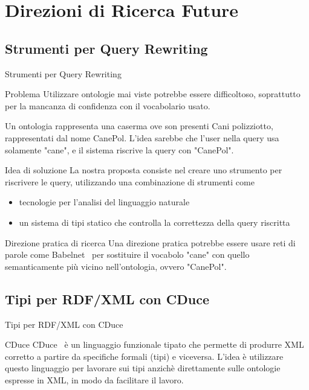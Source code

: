 \section{Direzioni di Ricerca Future}

\subsection{Strumenti per Query Rewriting}
\begin{frame}{Strumenti per Query Rewriting}
    \begin{block}{Problema}
        Utilizzare ontologie mai viste potrebbe essere difficoltoso, soprattutto per la mancanza di confidenza con il vocabolario usato.
    \end{block}
    
    \begin{example}
        Un ontologia rappresenta una caserma ove son presenti Cani polizziotto, rappresentati dal nome CanePol. L'idea sarebbe che l'user nella query usa solamente "cane", e il sistema riscrive la query con "CanePol".    
    \end{example}
\end{frame}
\begin{frame}
    \begin{block}{Idea di soluzione}
        La nostra proposta consiste nel creare uno strumento per riscrivere le query, utilizzando una combinazione di strumenti come 
        \begin{itemize}
            \item tecnologie per l'analisi del linguaggio naturale
            \item un sistema di tipi statico che controlla la correttezza della query riscritta 
        \end{itemize}
    \end{block}

    \begin{block}{Direzione pratica di ricerca}
        Una direzione pratica potrebbe essere usare reti di parole come Babelnet\footnotemark ~ per sostituire il vocabolo "cane" con quello semanticamente più vicino nell'ontologia, ovvero "CanePol".
    \end{block}
\end{frame}



\subsection{Tipi per RDF/XML con CDuce}
\begin{frame}{Tipi per RDF/XML con CDuce}
    \begin{block}{CDuce}
        CDuce\footnotemark ~ è un linguaggio funzionale tipato che permette di produrre XML corretto a partire da specifiche formali (tipi) e viceversa. L'idea è utilizzare questo linguaggio per lavorare sui tipi anzichè direttamente sulle ontologie espresse in XML, in modo da facilitare il lavoro.
    \end{block}
\end{frame}

